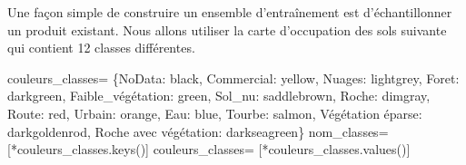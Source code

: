 \documentclass[
  11pt,
  letterpaper,
  open=any,
  twoside=false,
  french]{scrbook}
\newenvironment{Shaded}{\begin{snugshade}}{\end{snugshade}}
\newcommand{\NormalTok}[1]{\textcolor[rgb]{0.00,0.23,0.31}{#1}}
\newcommand{\OperatorTok}[1]{\textcolor[rgb]{0.37,0.37,0.37}{#1}}
\newcommand{\StringTok}[1]{\textcolor[rgb]{0.13,0.47,0.30}{#1}}
\begin{document}
Une façon simple de construire un ensemble d'entraînement est
d'échantillonner un produit existant. Nous allons utiliser la carte
d'occupation des sols suivante qui contient 12 classes différentes.

\begin{Shaded}
\begin{Highlighting}[]
\NormalTok{couleurs\_classes}\OperatorTok{=}\NormalTok{ \{}\StringTok{\textquotesingle{}NoData\textquotesingle{}}\NormalTok{: }\StringTok{\textquotesingle{}black\textquotesingle{}}\NormalTok{, }\StringTok{\textquotesingle{}Commercial\textquotesingle{}}\NormalTok{: }\StringTok{\textquotesingle{}yellow\textquotesingle{}}\NormalTok{, }\StringTok{\textquotesingle{}Nuages\textquotesingle{}}\NormalTok{: }\StringTok{\textquotesingle{}lightgrey\textquotesingle{}}\NormalTok{, }
                    \StringTok{\textquotesingle{}Foret\textquotesingle{}}\NormalTok{: }\StringTok{\textquotesingle{}darkgreen\textquotesingle{}}\NormalTok{, }\StringTok{\textquotesingle{}Faible\_végétation\textquotesingle{}}\NormalTok{: }\StringTok{\textquotesingle{}green\textquotesingle{}}\NormalTok{, }\StringTok{\textquotesingle{}Sol\_nu\textquotesingle{}}\NormalTok{: }\StringTok{\textquotesingle{}saddlebrown\textquotesingle{}}\NormalTok{,}
                  \StringTok{\textquotesingle{}Roche\textquotesingle{}}\NormalTok{: }\StringTok{\textquotesingle{}dimgray\textquotesingle{}}\NormalTok{, }\StringTok{\textquotesingle{}Route\textquotesingle{}}\NormalTok{: }\StringTok{\textquotesingle{}red\textquotesingle{}}\NormalTok{, }\StringTok{\textquotesingle{}Urbain\textquotesingle{}}\NormalTok{: }\StringTok{\textquotesingle{}orange\textquotesingle{}}\NormalTok{, }\StringTok{\textquotesingle{}Eau\textquotesingle{}}\NormalTok{: }\StringTok{\textquotesingle{}blue\textquotesingle{}}\NormalTok{, }\StringTok{\textquotesingle{}Tourbe\textquotesingle{}}\NormalTok{: }\StringTok{\textquotesingle{}salmon\textquotesingle{}}\NormalTok{, }\StringTok{\textquotesingle{}Végétation éparse\textquotesingle{}}\NormalTok{: }\StringTok{\textquotesingle{}darkgoldenrod\textquotesingle{}}\NormalTok{, }\StringTok{\textquotesingle{}Roche avec végétation\textquotesingle{}}\NormalTok{: }\StringTok{\textquotesingle{}darkseagreen\textquotesingle{}}\NormalTok{\}}
\NormalTok{nom\_classes}\OperatorTok{=}\NormalTok{ [}\OperatorTok{*}\NormalTok{couleurs\_classes.keys()]}
\NormalTok{couleurs\_classes}\OperatorTok{=}\NormalTok{ [}\OperatorTok{*}\NormalTok{couleurs\_classes.values()]}
\end{Highlighting}
\end{Shaded}
\end{document}
